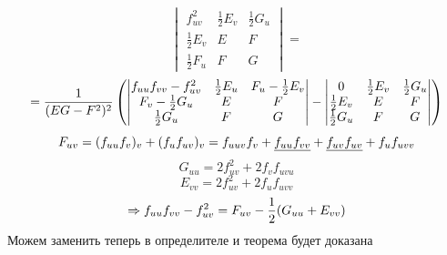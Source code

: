 \documentclass[main]{subfiles}
\begin{document}
\begin{Proof}
\[{\begin{vmatrix}
            f_{uv}^2 & \frac{1}{2}E_v & \frac{1}{2} G_u\\
            \frac{1}{2}E_v & E & F\\
            \frac{1}{2}F_u & F & G
            \end{vmatrix}} =
        \]
        \[ = \frac{1}{(EG - F^2)^2} \left(\begin{vmatrix}
            f_{uu} f_{vv} - f_{uv}^2 & \frac{1}{2} E_u & F_u - \frac{1}{2} E_v\\
            F_v - \frac{1}{2} G_u & E & F\\
            \frac{1}{2} G_u & F & G
            \end{vmatrix} - \begin{vmatrix}
            0 & \frac{1}{2}E_v & \frac{1}{2} G_u\\
            \frac{1}{2}E_v & E & F\\
            \frac{1}{2}G_u & F & G
            \end{vmatrix}\right)
        \]
        \[F_{uv} = (f_{uu} f_v)_v + (f_u f_{uv})_v = f_{uuv} f_v + \underline{f_{uu}f_{vv}} + \underline{f_{uv}f_{uv}} + f_u f_{uvv}\]
        \[G_{uu} = 2 f_{uv}^2 + 2 f_v f_{uvu}\]
        \[E_{vv} = 2 f_{uv}^2 + 2 f_u f_{uvv}\]
        \[\Rightarrow f_{uu} f_{vv} - f^2_{uv} = F_{uv} - \frac{1}{2}(G_{uu}+E_{vv})\]
        Можем заменить теперь в определителе и теорема будет доказана
    \end{Proof}
\end{document}
